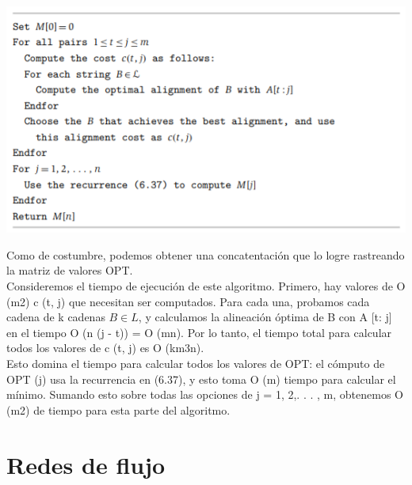 \documentclass[a4paper, 12pt]{book}
\begin{document}
\includegraphics[scale=1]{Imagenes-Seccion6/cod6_19.PNG}

Como de costumbre, podemos obtener una concatentación que lo logre rastreando la matriz de valores OPT.\\

Consideremos el tiempo de ejecución de este algoritmo. Primero, hay valores de O (m2) c (t, j) que necesitan ser computados. Para cada una, probamos cada cadena de k cadenas $B  \in  L$, y calculamos la alineación óptima de B con A [t: j] en el tiempo O (n (j - t)) = O (mn). Por lo tanto, el tiempo total para calcular todos los valores de c (t, j) es O (km3n).\\

Esto domina el tiempo para calcular todos los valores de OPT: el cómputo de OPT (j) usa la recurrencia en (6.37), y esto toma O (m) tiempo para calcular el mínimo. Sumando esto sobre todas las opciones de j = 1, 2,. . . , m, obtenemos O (m2) de tiempo para esta parte del algoritmo.\\



\chapter{Redes de flujo}

\end{document}
